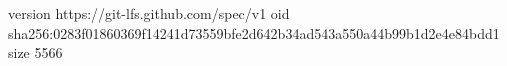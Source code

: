 version https://git-lfs.github.com/spec/v1
oid sha256:0283f01860369f14241d73559bfe2d642b34ad543a550a44b99b1d2e4e84bdd1
size 5566
